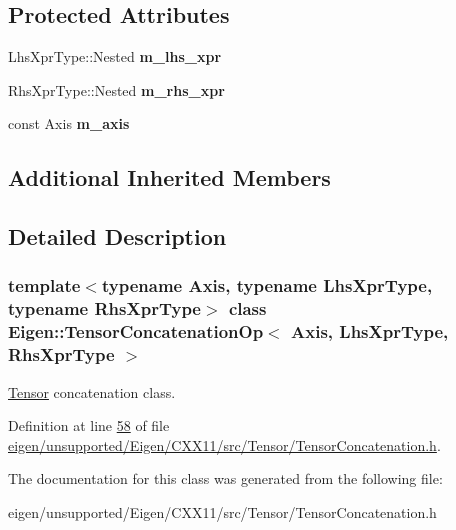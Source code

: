 \subsection*{Protected Attributes}
\begin{DoxyCompactItemize}
\item 
\mbox{\label{class_eigen_1_1_tensor_concatenation_op_ad92209adbb94862ec2f9d53a882eb8db}} 
Lhs\+Xpr\+Type\+::\+Nested {\bfseries m\+\_\+lhs\+\_\+xpr}
\item 
\mbox{\label{class_eigen_1_1_tensor_concatenation_op_a7a2c714579db12b6016754e24675ddd7}} 
Rhs\+Xpr\+Type\+::\+Nested {\bfseries m\+\_\+rhs\+\_\+xpr}
\item 
\mbox{\label{class_eigen_1_1_tensor_concatenation_op_a9add3da4824fe46a3a523f823e0aebe9}} 
const Axis {\bfseries m\+\_\+axis}
\end{DoxyCompactItemize}
\subsection*{Additional Inherited Members}


\subsection{Detailed Description}
\subsubsection*{template$<$typename Axis, typename Lhs\+Xpr\+Type, typename Rhs\+Xpr\+Type$>$\newline
class Eigen\+::\+Tensor\+Concatenation\+Op$<$ Axis, Lhs\+Xpr\+Type, Rhs\+Xpr\+Type $>$}

\hyperlink{class_eigen_1_1_tensor}{Tensor} concatenation class. 

Definition at line \hyperlink{eigen_2unsupported_2_eigen_2_c_x_x11_2src_2_tensor_2_tensor_concatenation_8h_source_l00058}{58} of file \hyperlink{eigen_2unsupported_2_eigen_2_c_x_x11_2src_2_tensor_2_tensor_concatenation_8h_source}{eigen/unsupported/\+Eigen/\+C\+X\+X11/src/\+Tensor/\+Tensor\+Concatenation.\+h}.



The documentation for this class was generated from the following file\+:\begin{DoxyCompactItemize}
\item 
eigen/unsupported/\+Eigen/\+C\+X\+X11/src/\+Tensor/\+Tensor\+Concatenation.\+h\end{DoxyCompactItemize}
